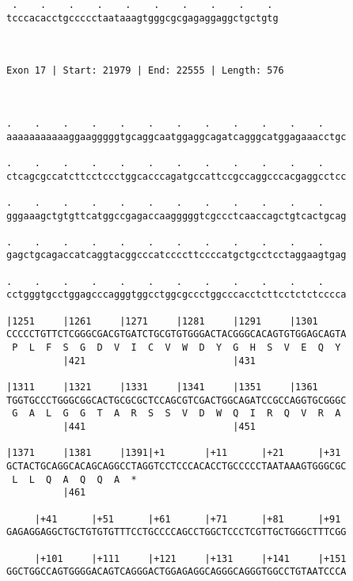 \documentclass{article}
\begin{document}
\begin{Verbatim}
 .    .    .    .    .    .    .    .    .    . 
tcccacacctgccccctaataaagtgggcgcgagaggaggctgctgtg
                                                
                                                
 
Exon 17 | Start: 21979 | End: 22555 | Length: 576



.    .    .    .    .    .    .    .    .    .    .    .    
aaaaaaaaaaaggaagggggtgcaggcaatggaggcagatcagggcatggagaaacctgc
                                                            
.    .    .    .    .    .    .    .    .    .    .    .    
ctcagcgccatcttcctccctggcacccagatgccattccgccaggcccacgaggcctcc
                                                            
.    .    .    .    .    .    .    .    .    .    .    .    
gggaaagctgtgttcatggccgagaccaagggggtcgccctcaaccagctgtcactgcag
                                                            
.    .    .    .    .    .    .    .    .    .    .    .    
gagctgcagaccatcaggtacggcccatccccttccccatgctgcctcctaggaagtgag
                                                            
.    .    .    .    .    .    .    .    .    .    .    .    
cctgggtgcctggagcccagggtggcctggcgccctggcccacctcttcctctctcccca
                                                            
|1251     |1261     |1271     |1281     |1291     |1301     
CCCCCTGTTCTCGGGCGACGTGATCTGCGTGTGGGACTACGGGCACAGTGTGGAGCAGTA
 P  L  F  S  G  D  V  I  C  V  W  D  Y  G  H  S  V  E  Q  Y 
          |421                          |431                
  
|1311     |1321     |1331     |1341     |1351     |1361     
TGGTGCCCTGGGCGGCACTGCGCGCTCCAGCGTCGACTGGCAGATCCGCCAGGTGCGGGC
 G  A  L  G  G  T  A  R  S  S  V  D  W  Q  I  R  Q  V  R  A 
          |441                          |451                
  
|1371     |1381     |1391|+1       |+11      |+21      |+31 
GCTACTGCAGGCACAGCAGGCCTAGGTCCTCCCACACCTGCCCCCTAATAAAGTGGGCGC
 L  L  Q  A  Q  Q  A  *   
          |461                                              
  
     |+41      |+51      |+61      |+71      |+81      |+91 
GAGAGGAGGCTGCTGTGTGTTTCCTGCCCCAGCCTGGCTCCCTCGTTGCTGGGCTTTCGG
                                                            
     |+101     |+111     |+121     |+131     |+141     |+151
GGCTGGCCAGTGGGGACAGTCAGGGACTGGAGAGGCAGGGCAGGGTGGCCTGTAATCCCA
                                                            

\end{Verbatim}
\end{document}
